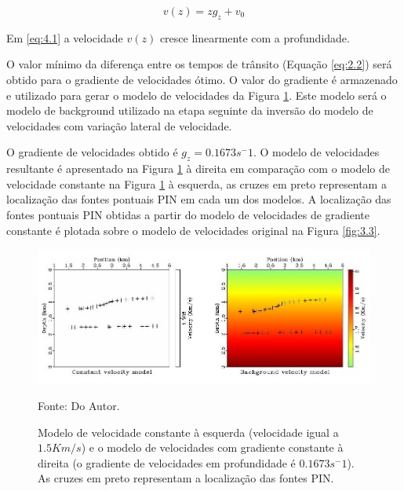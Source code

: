 \begin{equation}
\label{eq:4.1}
v(z)=z g_z+v_0
\end{equation}

Em \ref{eq:4.1} a velocidade $v(z)$ cresce linearmente com a profundidade.

O valor mínimo da diferença entre os tempos de trânsito (Equação \ref{eq:2.2})
será obtido para o gradiente de velocidades ótimo.
O valor do gradiente é armazenado e utilizado para gerar o modelo de velocidades
da Figura \ref{fig:3.2}. Este modelo será o modelo de background utilizado na etapa seguinte
da inversão do modelo de velocidades com variação lateral de velocidade.

O gradiente de velocidades obtido é $g_z=0.1673 s^-1$. O modelo de velocidades resultante é apresentado na
Figura \ref{fig:3.2} à direita em comparação com o modelo de velocidade constante na Figura \ref{fig:3.2}
à esquerda, as cruzes em preto representam a localização das fontes pontuais PIN em cada um dos modelos.
A localização das fontes pontuais PIN obtidas a partir do modelo de velocidades de gradiente constante
é plotada sobre o modelo de velocidades original na Figura \ref{fig:3.3}.

\begin{figure}[H]
\caption{Modelo de velocidade constante à esquerda (velocidade igual a $1.5Km/s$)
e o modelo de velocidades com gradiente constante à direita
(o gradiente de velocidades em profundidade é $0.1673 s^-1$).
As cruzes em preto representam a localização das fontes PIN.}
\begin{center}
\includegraphics[scale=2]{images/compare.jpeg}
\vspace{-0.3cm}
\end{center}
\begin{center}
 Fonte: Do Autor.
\end{center}
\label{fig:3.2}
\end{figure}

